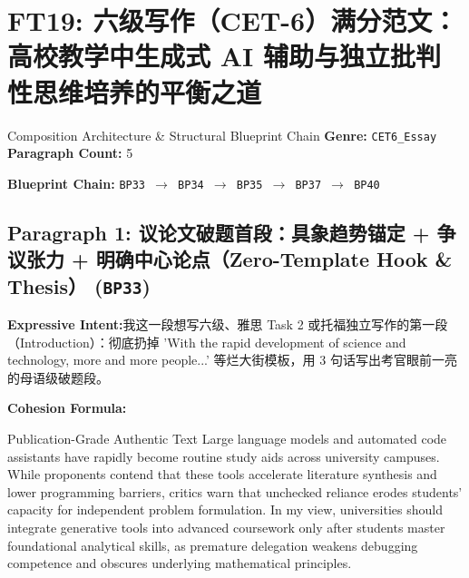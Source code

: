 \section{FT19: 六级写作（CET-6）满分范文：高校教学中生成式 AI 辅助与独立批判性思维培养的平衡之道}\label{comp:FT19}
\begin{ConceptBox}{Composition Architecture \& Structural Blueprint Chain}
\textbf{Genre:} \texttt{CET6\_Essay} \quad \textbf{Paragraph Count:} 5\par
\textbf{Blueprint Chain:} \texttt{BP33 $\to$ BP34 $\to$ BP35 $\to$ BP37 $\to$ BP40}
\end{ConceptBox}
\subsection*{Paragraph 1: 议论文破题首段：具象趋势锚定 + 争议张力 + 明确中心论点（Zero-Template Hook \& Thesis） (\texttt{BP33})}
\noindent\textbf{Expressive Intent:}\enspace 我这一段想写六级、雅思 Task 2 或托福独立写作的第一段（Introduction）：彻底扔掉 'With the rapid development of science and technology, more and more people...' 等烂大街模板，用 3 句话写出考官眼前一亮的母语级破题段。\par
\noindent\textbf{Cohesion Formula:}\par\vspace{4pt}
\begin{ExampleBox}{Publication-Grade Authentic Text}
Large language models and automated code assistants have rapidly become routine study aids across university campuses. While proponents contend that these tools accelerate literature synthesis and lower programming barriers, critics warn that unchecked reliance erodes students' capacity for independent problem formulation. In my view, universities should integrate generative tools into advanced coursework only after students master foundational analytical skills, as premature delegation weakens debugging competence and obscures underlying mathematical principles.
\end{ExampleBox}
